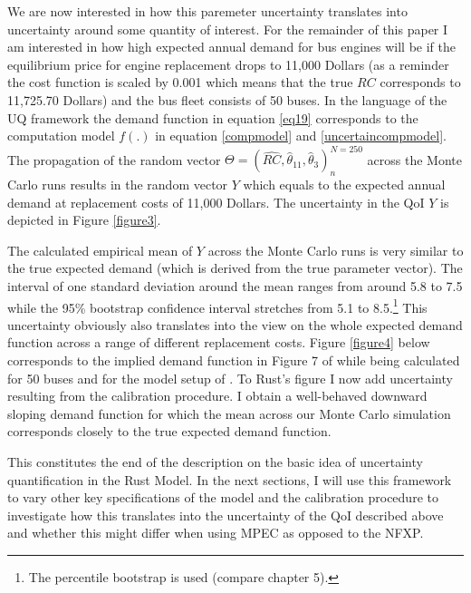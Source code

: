 We are now interested in how this paremeter uncertainty translates into uncertainty around some quantity of interest. For the remainder of this paper I am interested in how high expected annual demand for bus engines will be if the equilibrium price for engine replacement drops to 11,000 Dollars (as a reminder the cost function is scaled by 0.001 which means that the true $RC$ corresponds to 11,725.70 Dollars) and the bus fleet consists of 50 buses. In the language of the UQ framework the demand function in equation \ref{eq19} corresponds to the computation model $f(.)$ in equation \ref{compmodel} and \ref{uncertaincompmodel}. The propagation of the random vector $\Theta = (\hat{RC}, \hat\theta_{11}, \hat\theta_3)^{N=250}_n$ across the Monte Carlo runs results in the random vector $Y$ which equals to the expected annual demand at replacement costs of 11,000 Dollars. The uncertainty in the QoI $Y$ is depicted in Figure \ref{figure3}.


The calculated empirical mean of $Y$ across the Monte Carlo runs is very similar to the true expected demand (which is derived from the true parameter vector). The interval of one standard deviation around the mean ranges from around 5.8 to 7.5 while the 95\% bootstrap confidence interval stretches from 5.1 to 8.5.\footnote{The percentile bootstrap is used (compare \cite{Davison.1997} chapter 5).} This uncertainty obviously also translates into the view on the whole expected demand function across a range of different replacement costs. Figure \ref{figure4} below corresponds to the implied demand function in Figure 7 of \cite{Rust.1987} while being calculated for 50 buses and for the model setup of \cite{Iskhakov.2016}. To Rust's figure I now add uncertainty resulting from the calibration procedure. I obtain a well-behaved downward sloping demand function for which the mean across our Monte Carlo simulation corresponds closely to the true expected demand function.

This constitutes the end of the description on the basic idea of uncertainty quantification in the Rust Model. In the next sections, I will use this framework to vary other key specifications of the model and the calibration procedure to investigate how this translates into the uncertainty of the QoI described above and whether this might differ when using MPEC as opposed to the NFXP.

